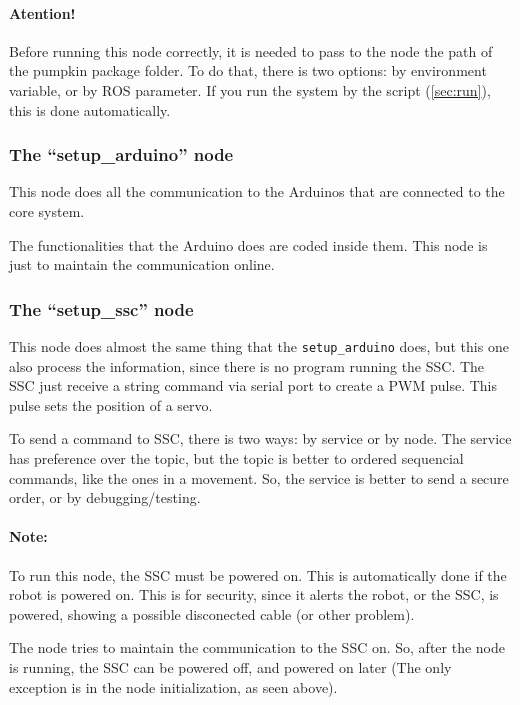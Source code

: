\documentclass[oneside,a4paper,titlepage]{article}
\begin{document}
\paragraph{\color{red} Atention! }

Before running this node correctly, it is needed to pass to the node the path of the pumpkin package folder. To do that, there is two options: by environment variable, or by ROS parameter. If you run the system by the script (\ref{sec:run}), this is done automatically.

\subsubsection{The ``setup\_arduino'' node}

This node does all the communication to the Arduinos that are connected to the core system.

The functionalities that the Arduino does are coded inside them. This node is just to maintain the communication online.

\subsubsection{The ``setup\_ssc'' node}

This node does almost the same thing that the \texttt{setup\_arduino} does, but this one also process the information, since there is no program running the SSC. The SSC just receive a string command via serial port to create a PWM pulse. This pulse sets the position of a servo.

To send a command to SSC, there is two ways: by service or by node.
The service has preference over the topic, but the topic is better to ordered sequencial commands, like the ones in a movement. So, the service is better to send a secure order, or by debugging/testing.

\paragraph{Note: } To run this node, the SSC must be powered on. This is automatically done if the robot is powered on. This is for security, since it alerts the robot, or the SSC, is powered, showing a possible disconected cable (or other problem).

The node tries to maintain the communication to the SSC on. So, after the node is running, the SSC can be powered off, and powered on later (The only exception is in the node initialization, as seen above).
\end{document}
